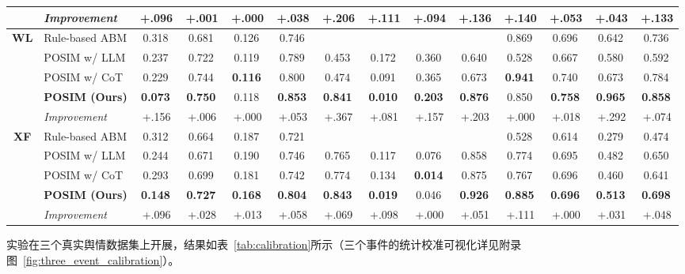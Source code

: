 \documentclass[a4paper,fleqn]{cas-sc}
\newcommand{\best}[1]{\textbf{#1}}
\newcommand{\na}{\text{---}}
\newcommand{\gain}[1]{{\textcolor{gaingreen}{\,#1}}}
\begin{document}
\begin{table}[!t]
{\begin{tabular}{@{}cl cccc cccc cccc@{}}
\rowcolor{oursrow}
& \textit{Improvement} & \gain{+.096} & \gain{+.001} & \gain{+.000} & \gain{+.038} & \gain{+.206} & \gain{+.111} & \gain{+.094} & \gain{+.136} & \gain{+.140} & \gain{+.053} & \gain{+.043} & \gain{+.133} \\
\midrule
\multirow{5}{*}{\textbf{WL}}
& Rule-based ABM        & 0.318 & 0.681 & 0.126 & 0.746 & \na & \na & \na & \na & 0.869 & 0.696 & 0.642 & 0.736 \\
& POSIM w/ LLM        & 0.237 & 0.722 & 0.119 & 0.789 & 0.453 & 0.172 & 0.360 & 0.640 & 0.528 & 0.667 & 0.580 & 0.592 \\
& POSIM w/ CoT          & 0.229 & 0.744 & \best{0.116} & 0.800 & 0.474 & 0.091 & 0.365 & 0.673 & \best{0.941} & 0.740 & 0.673 & 0.784 \\
\rowcolor{oursrow}
& \textbf{POSIM (Ours)}  & \best{0.073} & \best{0.750} & 0.118 & \best{0.853} & \best{0.841} & \best{0.010} & \best{0.203} & \best{0.876} & 0.850 & \best{0.758} & \best{0.965} & \best{0.858} \\[1pt]
\rowcolor{oursrow}
& \textit{Improvement} & \gain{+.156} & \gain{+.006} & \gain{+.000} & \gain{+.053} & \gain{+.367} & \gain{+.081} & \gain{+.157} & \gain{+.203} & \gain{+.000} & \gain{+.018} & \gain{+.292} & \gain{+.074} \\
\midrule
\multirow{5}{*}{\textbf{XF}}
& Rule-based ABM        & 0.312 & 0.664 & 0.187 & 0.721 & \na & \na & \na & \na & 0.528 & 0.614 & 0.279 & 0.474 \\
& POSIM w/ LLM        & 0.244 & 0.671 & 0.190 & 0.746 & 0.765 & 0.117 & 0.076 & 0.858 & 0.774 & 0.695 & 0.482 & 0.650 \\
& POSIM w/ CoT          & 0.293 & 0.699 & 0.181 & 0.742 & 0.774 & 0.134 & \best{0.014} & 0.875 & 0.767 & 0.696 & 0.460 & 0.641 \\
\rowcolor{oursrow}
& \textbf{POSIM (Ours)}  & \best{0.148} & \best{0.727} & \best{0.168} & \best{0.804} & \best{0.843} & \best{0.019} & 0.046 & \best{0.926} & \best{0.885} & \best{0.696} & \best{0.513} & \best{0.698} \\[1pt]
\rowcolor{oursrow}
& \textit{Improvement} & \gain{+.096} & \gain{+.028} & \gain{+.013} & \gain{+.058} & \gain{+.069} & \gain{+.098} & \gain{+.000} & \gain{+.051} & \gain{+.111} & \gain{+.000} & \gain{+.031} & \gain{+.048} \\
\bottomrule
\end{tabular}%
}
\end{table}

实验在三个真实舆情数据集上开展，结果如表~\ref{tab:calibration}所示（三个事件的统计校准可视化详见附录图~\ref{fig:three_event_calibration}）。
\end{document}
